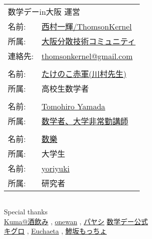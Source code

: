 \documentclass[b5paper,fleqn]{ltjsarticle}
\begin{document}
\newpage
\thispagestyle{empty}
\vspace*{\fill}
\begin{flushright}
\begin{minipage}{0.5\hsize}
  \begin{tabular}{|ll}
  \multicolumn{2}{|l}{数学デーin大阪 運営}\\[10pt]
  名前: &\href{https://twitter.com/ThomsonKernel}{西村一輝/ThomsonKernel}\\
  所属: &\href{https://sites.google.com/view/osaka-dtc}{大阪分散技術コミュニティ}\\
  連絡先: & \href{mailto:thomsonkernel@gmail.com}{thomsonkernel@gmail.com}\\
  \\
  名前: &\href{https://twitter.com/691_7758337633}{たけのこ赤軍(川村先生)}\\
  所属: &高校生数学者\\
  \\
  名前: &\href{https://twitter.com/tyamada1093}{Tomohiro Yamada}\\
  所属: &\href{https://kansai-lisp-useres.connpass.com}{数学者、大学非常勤講師}\\
  \\
  名前: &\href{https://twitter.com/coc_mathfun}{数樂}\\
  所属: &大学生\\
  名前: &\href{https://twitter.com/yoriyuki}{yoriyuki}\\
  所属: &研究者\\
  \end{tabular}
  \begin{tabular}{l}
\end{tabular}\vskip15pt
Special thanks\\
   \href{https://twitter.com/notori48}{Kuma@酒飲み}
   , \href{https://twitter.com/ONEWAN}{onewan}
   , \href{https://twitter.com/Paya_payashi}{パヤシ}\vskip10pt
   \href{https://twitter.com/sugaku_day}{数学デー公式}\\
   \href{https://twitter.com/kiguro_masanao}{キグロ}
   , \href{https://twitter.com/euchaeta}{Euchaeta}
   , \href{https://twitter.com/motcho_tw}{鯵坂もっちょ}
\end{minipage}
\end{flushright}
\end{document}
